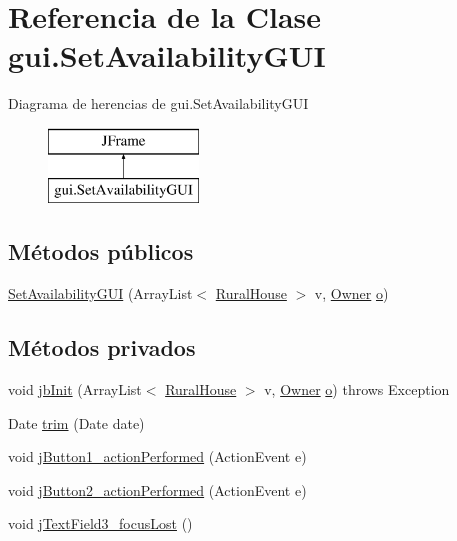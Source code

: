 \hypertarget{classgui_1_1_set_availability_g_u_i}{}\section{Referencia de la Clase gui.\+Set\+Availability\+G\+UI}
\label{classgui_1_1_set_availability_g_u_i}
Diagrama de herencias de gui.\+Set\+Availability\+G\+UI\begin{figure}[H]
\begin{center}
\leavevmode
\includegraphics[height=2.000000cm]{classgui_1_1_set_availability_g_u_i}
\end{center}
\end{figure}
\subsection*{Métodos públicos}
\begin{DoxyCompactItemize}
\item 
\mbox{\hyperlink{classgui_1_1_set_availability_g_u_i_a4222ca741f88236a6bf90ee6719dc2d1}{Set\+Availability\+G\+UI}} (Array\+List$<$ \mbox{\hyperlink{classdomain_1_1_rural_house}{Rural\+House}} $>$ v, \mbox{\hyperlink{classdomain_1_1_owner}{Owner}} \mbox{\hyperlink{classgui_1_1_set_availability_g_u_i_a02f2fb2b0ea2556d734c4f066d396f44}{o}})
\end{DoxyCompactItemize}
\subsection*{Métodos privados}
\begin{DoxyCompactItemize}
\item 
void \mbox{\hyperlink{classgui_1_1_set_availability_g_u_i_ae47e0bfcc0ac5edd6f046cae6083362e}{jb\+Init}} (Array\+List$<$ \mbox{\hyperlink{classdomain_1_1_rural_house}{Rural\+House}} $>$ v, \mbox{\hyperlink{classdomain_1_1_owner}{Owner}} \mbox{\hyperlink{classgui_1_1_set_availability_g_u_i_a02f2fb2b0ea2556d734c4f066d396f44}{o}})  throws Exception   
\item 
Date \mbox{\hyperlink{classgui_1_1_set_availability_g_u_i_a7c4086581e82a57cf4753001fe147884}{trim}} (Date date)
\item 
void \mbox{\hyperlink{classgui_1_1_set_availability_g_u_i_a58fefb68e778d7404ca8866d27ae2492}{j\+Button1\+\_\+action\+Performed}} (Action\+Event e)
\item 
void \mbox{\hyperlink{classgui_1_1_set_availability_g_u_i_a8b6b121580714af5fbe8aff6de5d18d6}{j\+Button2\+\_\+action\+Performed}} (Action\+Event e)
\item 
void \mbox{\hyperlink{classgui_1_1_set_availability_g_u_i_a01ddacea68e2ac12e3d8421b8c1ba183}{j\+Text\+Field3\+\_\+focus\+Lost}} ()
\end{DoxyCompactItemize}
